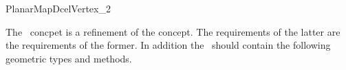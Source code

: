 
\ccRefPageBegin


\begin{ccRefConcept}{PlanarMapDcelVertex_2}


The \ccRefName\ concpet is a refinement of the  concept. 
The requirements of the latter are the requirements of the former.
In addition the \ccRefName\ should contain the  following geometric types and methods.

  \ccTypes
{}

  \ccOperations
  

\end{ccRefConcept} %

\ccRefPageEnd

